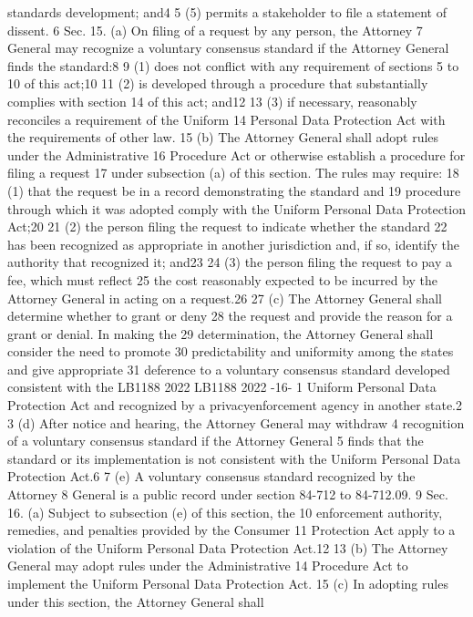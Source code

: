standards development; and4
5 (5) permits a stakeholder to file a statement of dissent.
6 Sec. 15. (a) On filing of a request by any person, the Attorney
7 General may recognize a voluntary consensus standard if the Attorney
General finds the standard:8
9 (1) does not conflict with any requirement of sections 5 to 10 of
this act;10
11 (2) is developed through a procedure that substantially complies
with section 14 of this act; and12
13 (3) if necessary, reasonably reconciles a requirement of the Uniform
14 Personal Data Protection Act with the requirements of other law.
15 (b) The Attorney General shall adopt rules under the Administrative
16 Procedure Act or otherwise establish a procedure for filing a request
17 under subsection (a) of this section. The rules may require:
18 (1) that the request be in a record demonstrating the standard and
19 procedure through which it was adopted comply with the Uniform Personal
Data Protection Act;20
21 (2) the person filing the request to indicate whether the standard
22 has been recognized as appropriate in another jurisdiction and, if so,
identify the authority that recognized it; and23
24 (3) the person filing the request to pay a fee, which must reflect
25 the cost reasonably expected to be incurred by the Attorney General in
acting on a request.26
27 (c) The Attorney General shall determine whether to grant or deny
28 the request and provide the reason for a grant or denial. In making the
29 determination, the Attorney General shall consider the need to promote
30 predictability and uniformity among the states and give appropriate
31 deference to a voluntary consensus standard developed consistent with the
LB1188
2022
LB1188
2022
-16-
1 Uniform Personal Data Protection Act and recognized by a privacyenforcement agency in another state.2
3 (d) After notice and hearing, the Attorney General may withdraw
4 recognition of a voluntary consensus standard if the Attorney General
5 finds that the standard or its implementation is not consistent with the
Uniform Personal Data Protection Act.6
7 (e) A voluntary consensus standard recognized by the Attorney
8 General is a public record under section 84-712 to 84-712.09.
9 Sec. 16. (a) Subject to subsection (e) of this section, the
10 enforcement authority, remedies, and penalties provided by the Consumer
11 Protection Act apply to a violation of the Uniform Personal Data
Protection Act.12
13 (b) The Attorney General may adopt rules under the Administrative
14 Procedure Act to implement the Uniform Personal Data Protection Act.
15 (c) In adopting rules under this section, the Attorney General shall
